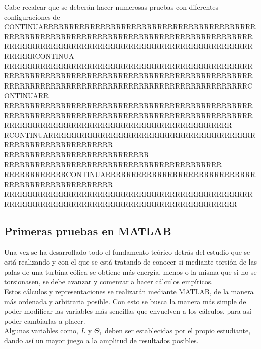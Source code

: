 Cabe recalcar que se deberán hacer numerosas pruebas con diferentes configuraciones de CONTINUARRRRRRRRRRRRRRRRRRRRRRRRRRRRRRRRRRRRRRRRRRRRRRRRRRRRRRRRRRRRRRRRRRRRRRRRRRRRRRRRRRRRRRRRRRRRRRRRRRRRRRRRRRRRRRRRRRRRRRRRRRRRRRRRRRRRRRRRRRRRRRRCONTINUA RRRRRRRRRRRRRRRRRRRRRRRRRRRRRRRRRRRRRRRRRRRRRRRRRRRRRRRRRRRRRRRRRRRRRRRRRRRRRRRRRRRRRRRRRRRRRRRRRRRRRRRRRRRRRRRRRRRRRRRRRRRRRRRRRRRRRRRRRRRRRRRCONTINUARR
RRRRRRRRRRRRRRRRRRRRRRRRRRRRRRRRRRRRRRRRRRRRRRRRRRRRRRRRRRRRRRRRRRRRRRRRRRRRRRRRRRRRRRRRRRRRRRRRRRRRRRRRRRRRRRRRRRRRRRRRRRRRRRRRRRRRRRRRRRRR
RCONTINUARRRRRRRRRRRRRRRRRRRRRRRRRRRRRRRRRRRRRRRRRRRRRRRRRRRRRRRRRRRRR
RRRRRRRRRRRRRRRRRRRRRRRRRRRR
RRRRRRRRRRRRRRRRRRRRRRRRRRRRRRRRRRRRRRRRRR
RRRRRRRRRRRRCONTINUARRRRRRRRRRRRRRRRRRRRRRRRRRRRRRRRRRRRRRRRRRRRRRRRRR
RRRRRRRRRRRRRRRRRRRRRRRRRRRRRRRRRRRRRRRRRRRRRRRRRRRRRRRRRRRRRRRRRRRRRRRRRRRRRRRRRRRRRRRRRRRRR
 
\subsection{Primeras pruebas en MATLAB}

Una vez se ha desarrollado todo el fundamento teórico detrás del estudio que se está realizando y con el que se está tratando de conocer si mediante torsión de las palas de una turbina eólica se obtiene más energía, menos o la misma que si no se torsionasen, se debe avanzar y comenzar a hacer cálculos empíricos. \\

Estos cálculos y representaciones se realizarán mediante MATLAB, de la manera más ordenada y arbitraria posible. Con esto se busca la manera más simple de poder modificar las variables más sencillas que envuelven a los cálculos, para así poder cambiarlas a placer. \\

Algunas variables como, $L$ y $\Theta_1$ deben ser establecidas por el propio estudiante, dando así un mayor juego a la amplitud de resultados posibles. \\
